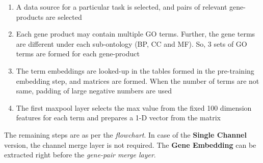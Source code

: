 \begin{sloppypar*}
        \begin{enumerate}
            \item A data source for a particular task is selected, and pairs of 
            relevant gene-products are selected
            \item Each gene product may contain multiple GO terms. Further, the 
            gene terms are different under each sub-ontology (BP, CC and MF). So, 3 sets
            of GO terms are formed for each gene-product
            \item The term embeddings are looked-up in the tables formed in the
            pre-training embedding step, and matrices are formed. When the number of
            terms are not same, padding of large negative numbers are used
            \item The first maxpool layer selects the max value from the fixed 100 dimension
            features for each term and prepares a 1-D vector from the matrix
        \end{enumerate}

        \noindent The remaining steps are as per the \textit{flowchart}. In case of 
        the \textbf{Single Channel} version, the channel merge layer is not required.
        The \textbf{Gene Embedding} can be extracted right before the \textit{gene-pair
        merge layer}.
        
\end{sloppypar*}